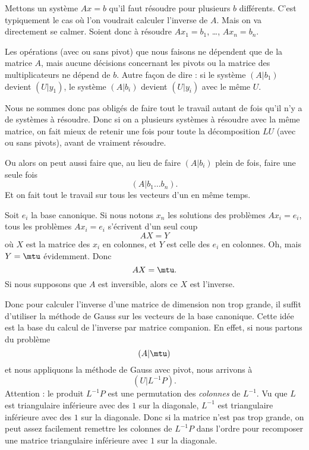 Mettons un système \( Ax=b\) qu'il faut résoudre pour plusieurs \( b\) différents. C'est typiquement le cas où l'on voudrait calculer l'inverse de \( A\). Mais on va directement se calmer. Soient donc à résoudre \( Ax_1=b_1\), \ldots, \( Ax_n=b_n\).

Les opérations (avec ou sans pivot) que nous faisons ne dépendent que de la matrice \( A\), mais aucune décisions concernant les pivots ou la matrice des multiplicateurs ne dépend de \( b\). Autre façon de dire : si le système \(  (A|b_1)  \) devient \( (U|y_1)\), le système \( (A|b_i)\) devient \( (U|y_i)\) avec le même \( U\).

Nous ne sommes donc pas obligés de faire tout le travail autant de fois qu'il n'y a de systèmes à résoudre. Donc si on a plusieurs systèmes à résoudre avec la même matrice, on fait mieux de retenir une fois pour toute la décomposition \( LU\) (avec ou sans pivots), avant de vraiment résoudre.

Ou alors on peut aussi faire que, au lieu de faire \( (A|b_i)\) plein de fois, faire une seule fois
\begin{equation}
    (A|b_1\ldots b_n).
\end{equation}
Et on fait tout le travail sur tous les vecteurs d'un en même temps.

Soit \( {e_i}\) la base canonique. Si nous notons \( x_n\) les solutions des problèmes \( Ax_i=e_i\), tous les problèmes \( Ax_i=e_i\) s'écrivent d'un seul coup 
\begin{equation}
    AX=Y
\end{equation}
où \( X\) est la matrice des \( x_i\) en colonnes, et \( Y\) est celle des \( e_i\) en colonnes. Oh, mais \( Y=\mtu\) évidemment. Donc
\begin{equation}
    AX=\mtu.
\end{equation}
Si nous supposons que \( A\) est inversible, alors ce \( X\) est l'inverse.

Donc pour calculer l'inverse d'une matrice de dimension non trop grande, il suffit d'utiliser la méthode de Gauss sur les vecteurs de la base canonique. Cette idée est la base du calcul de l'inverse par matrice companion. En effet, si nous partons du problème
\begin{equation}
    (A|\mtu)
\end{equation}
et nous appliquons la méthode de Gauss avec pivot, nous arrivons à
\begin{equation}
    (U|L^{-1} P).
\end{equation}
Attention : le produit \( L^{-1}P\) est une permutation des \emph{colonnes} de \( L^{-1}\). Vu que \( L\) est triangulaire inférieure avec des \( 1\) sur la diagonale, \( L^{-1}\) est triangulaire inférieure avec des \( 1\) sur la diagonale. Donc si la matrice n'est pas trop grande, on peut assez facilement remettre les colonnes de \( L^{-1}P\) dans l'ordre pour recomposer une matrice triangulaire inférieure avec \( 1\) sur la diagonale.

